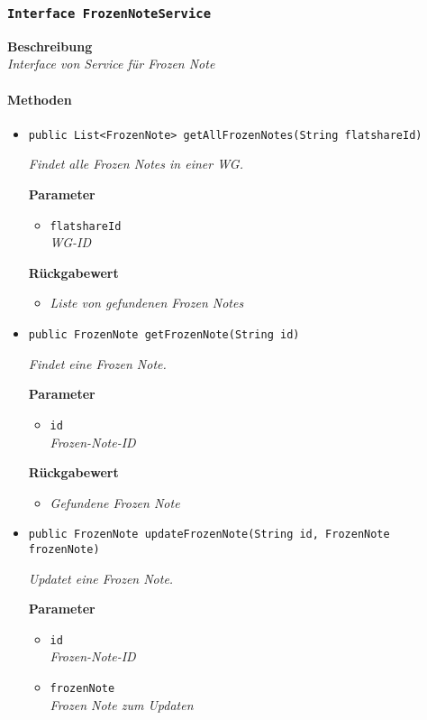      \subsubsection{\texttt{Interface FrozenNoteService}}
     \textbf{Beschreibung} \\
     \textit{Interface von Service für Frozen Note}
     \paragraph*{Methoden}
     \begin{itemize}
     	\item{\texttt{public List<FrozenNote> getAllFrozenNotes(String flatshareId)}}
     	
     	\textit{Findet alle Frozen Notes in einer WG.}
     	
     	\textbf{Parameter}
     	\begin{itemize}
     		\item\texttt{flatshareId}\\
     		\textit{WG-ID}
     	\end{itemize}
     	
     	\textbf{Rückgabewert}
     	\begin{itemize}
     		\item\textit{Liste von gefundenen Frozen Notes}
     	\end{itemize}
     
     \item{\texttt{public FrozenNote getFrozenNote(String id)}}
     	
     	\textit{Findet eine Frozen Note.}
     	
     	\textbf{Parameter}
     	\begin{itemize}
     		\item\texttt{id}\\
     		\textit{Frozen-Note-ID}
     	\end{itemize}
     	
     	\textbf{Rückgabewert}
     	\begin{itemize}
     		\item\textit{Gefundene Frozen Note}
     	\end{itemize}
     
     \item{\texttt{public FrozenNote updateFrozenNote(String id, FrozenNote frozenNote)}}
     	
     	\textit{Updatet eine Frozen Note.}
     	
     	\textbf{Parameter}
     	\begin{itemize}
     		\item\texttt{id}\\
     		\textit{Frozen-Note-ID}
     		\item\texttt{frozenNote}\\
     		\textit{Frozen Note zum Updaten}
     	\end{itemize}
     

\end{itemize}
